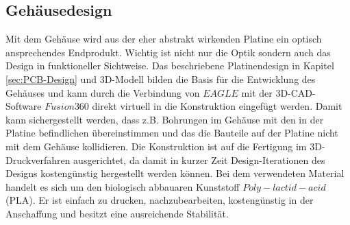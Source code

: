 
\subsection{Gehäusedesign}
Mit dem Gehäuse wird aus der eher abstrakt wirkenden Platine ein optisch ansprechendes Endprodukt. Wichtig ist nicht nur die Optik sondern auch das Design in funktioneller Sichtweise. Das beschriebene Platinendesign in Kapitel \ref{sec:PCB-Design} und 3D-Modell bilden die Basis für die Entwicklung des Gehäuses und kann durch die Verbindung von $EAGLE$ mit der 3D-CAD-Software $Fusion360$ direkt virtuell in die Konstruktion eingefügt werden. Damit kann sichergestellt werden, dass z.B. Bohrungen im Gehäuse mit den in der Platine befindlichen übereinstimmen und das die Bauteile auf der Platine nicht mit dem Gehäuse kollidieren. Die Konstruktion ist auf die Fertigung im 3D-Druckverfahren ausgerichtet, da damit in kurzer Zeit Design-Iterationen des Designs kostengünstig hergestellt werden können. Bei dem verwendeten Material handelt es sich um den biologisch abbauaren Kunststoff $Poly-lactid-acid$ (PLA). Er ist einfach zu drucken, nachzubearbeiten, kostengünstig in der Anschaffung und besitzt eine ausreichende Stabilität.


